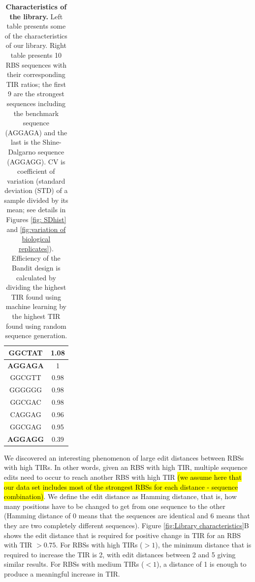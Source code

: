 \documentclass{scrartcl}[2013/05/29]%
\begin{document}
\begin{table}[!h]
\begin{minipage}[c]{0.38\textwidth}
\begin{tabular}{|c|c|}
GGCTAT                & 1.08              \\ \hline
\textbf{AGGAGA}                & 1                  \\ \hline
GGCGTT                & 0.98            \\ \hline
GGGGGG                & 0.98             \\ \hline
GGCGAC                & 0.98             \\ \hline
CAGGAG                & 0.96             \\ \hline
GGCGAG                & 0.95             \\ \hline
\textbf{AGGAGG}       & 0.39            \\ \hline
\end{tabular}
\end{minipage}
\caption{\textbf{Characteristics of the library.}
Left table presents some of the characteristics of our library.
Right table presents 10 RBS sequences with their corresponding TIR ratios; the first 9 are the strongest sequences including the benchmark sequence (AGGAGA) and the last is the Shine-Dalgarno sequence (AGGAGG).
CV is coefficient of variation (standard deviation (STD) of a sample divided by its mean; see details in Figures \ref{fig: SDhist} and \ref{fig:variation of biological replicates}).
Efficiency of the Bandit design is calculated by dividing the highest TIR found using machine learning by the highest TIR found using random sequence generation.}
\end{table}

We discovered an interesting phenomenon of large edit distances between RBSs with high TIRs.
In other words, given an RBS with high TIR, multiple sequence edits need to occur to reach another RBS with high TIR \hl{(we assume here that our data set includes most of the strongest RBSs for each distance - sequence combination)}.
We define the edit distance as Hamming distance, that is, how many positions have to be changed to get from one sequence to the other (Hamming distance of 0 means that the sequences are identical and 6 means that they are two completely different sequences).
Figure \ref{fig:Library characteristics}B shows the edit distance that is required for positive change in TIR for an RBS with TIR $>0.75$.
For RBSs with high TIRs ($>1$), the minimum distance that is required to increase the TIR is 2, with edit distances between 2 and 5 giving similar results.
For RBSs with medium TIRs ($<1$), a distance of 1 is enough to produce a meaningful increase in TIR.
\\
\end{document}
